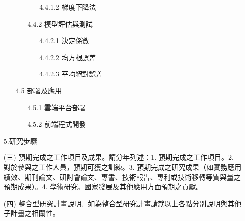 \documentclass[12pt,a4paper]{article}
\begin{document}
\begin{enumerate}
\begin{enumerate}
\begin{enumerate}
\begin{enumerate}
            \item[] 4.4.1.2 梯度下降法
        \end{enumerate}
        \item[] 4.4.2 模型評估與測試
        \begin{enumerate}
            \item[] 4.4.2.1 決定係數
            \item[] 4.4.2.2 均方根誤差
            \item[] 4.4.2.3 平均絕對誤差
        \end{enumerate}
    \end{enumerate}
    \item[] 4.5 部署及應用
    \begin{enumerate}
        \item[] 4.5.1 雲端平台部署
        \item[] 4.5.2 前端程式開發
    \end{enumerate}
\end{enumerate}
\item[] 5.研究步驟
\item[] 
\item[(三)] 預期完成之工作項目及成果。請分年列述：1. 預期完成之工作項目。2. 對於參與之工作人員，預期可獲之訓練。3. 預期完成之研究成果（如實務應用績效、期刊論文、研討會論文、專書、技術報告、專利或技術移轉等質與量之預期成果）。4. 學術研究、國家發展及其他應用方面預期之貢獻。
\item[] 
\item[(四)] 整合型研究計畫說明。如為整合型研究計畫請就以上各點分別說明與其他子計畫之相關性。
\item[] 
\end{enumerate}    

\label{LastPage}
\end{document}

